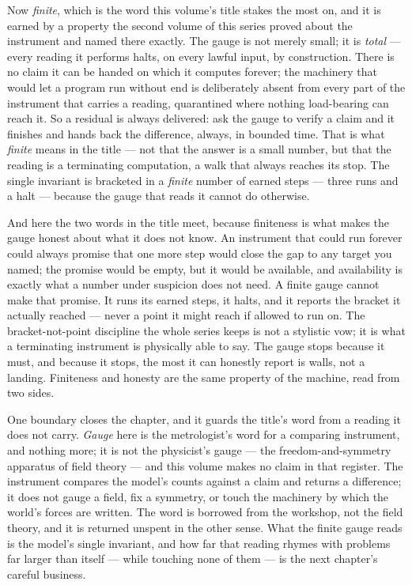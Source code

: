 Now \emph{finite}, which is the word this volume's title stakes the most
on, and it is earned by a property the second volume of this series proved
about the instrument and named there exactly. The gauge is not merely
small; it is \emph{total} --- every reading it performs halts, on every
lawful input, by construction. There is no claim it can be handed on which
it computes forever; the machinery that would let a program run without end
is deliberately absent from every part of the instrument that carries a
reading, quarantined where nothing load-bearing can reach it. So a residual
is always delivered: ask the gauge to verify a claim and it finishes and
hands back the difference, always, in bounded time. That is what
\emph{finite} means in the title --- not that the answer is a small number,
but that the reading is a terminating computation, a walk that always
reaches its stop. The single invariant is bracketed in a \emph{finite}
number of earned steps --- three runs and a halt --- because the gauge that
reads it cannot do otherwise.

And here the two words in the title meet, because finiteness is what makes
the gauge honest about what it does not know. An instrument that could run
forever could always promise that one more step would close the gap to any
target you named; the promise would be empty, but it would be available, and
availability is exactly what a number under suspicion does not need. A finite
gauge cannot make that promise. It runs its earned steps, it halts, and it
reports the bracket it actually reached --- never a point it might reach if
allowed to run on. The bracket-not-point discipline the whole series keeps
is not a stylistic vow; it is what a terminating instrument is physically
able to say. The gauge stops because it must, and because it stops, the most
it can honestly report is walls, not a landing. Finiteness and honesty are
the same property of the machine, read from two sides.

One boundary closes the chapter, and it guards the title's word from a
reading it does not carry. \emph{Gauge} here is the metrologist's word for a
comparing instrument, and nothing more; it is not the physicist's
gauge --- the freedom-and-symmetry apparatus of field theory --- and this
volume makes no claim in that register. The instrument compares the model's
counts against a claim and returns a difference; it does not gauge a field,
fix a symmetry, or touch the machinery by which the world's forces are
written. The word is borrowed from the workshop, not the field theory, and
it is returned unspent in the other sense. What the finite gauge reads is
the model's single invariant, and how far that reading rhymes with problems
far larger than itself --- while touching none of them --- is the next
chapter's careful business.
